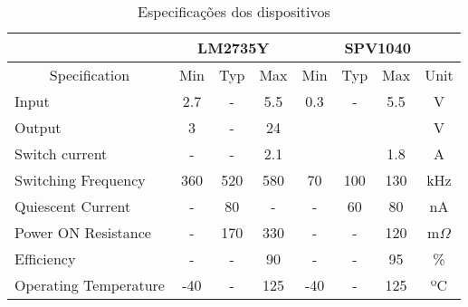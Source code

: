 \begin{table}
\centering
\caption{Especificações dos dispositivos}
\label{comparison_specs_table}
\begin{tabular}{|l|ccc|ccc|c|} 
\cline{2-8}
\multicolumn{1}{c|}{}               & \multicolumn{3}{c|}{LM2735Y}                              & \multicolumn{4}{c|}{SPV1040}                                           \\ 
\hline
\multicolumn{1}{|c|}{Specification} & \multicolumn{1}{c|}{Min} & \multicolumn{1}{c|}{Typ} & Max & \multicolumn{1}{c|}{Min} & \multicolumn{1}{c|}{Typ} & Max & Unit       \\ 
\hline
Input                               & 2.7                      & -                        & 5.5 & 0.3                      & -                        & 5.5 & V          \\ 
\hline
Output                              & 3                        & -                        & 24  &                          &                          &     & V          \\ 
\hline
Switch current                      & -                        & -                        & 2.1 &                          &                          & 1.8 & A          \\ 
\hline
Switching Frequency                 & 360                      & 520                      & 580 & 70                       & 100                      & 130 & kHz        \\ 
\hline
Quiescent Current                   & -                        & 80                       & -   & -                        & 60                       & 80  & nA         \\ 
\hline
Power ON Resistance                 & -                        & 170                      & 330 & -                        & -                        & 120 & m$\Omega$  \\ 
\hline
Efficiency                          & -                        & -                        & 90  & -                        & -                        & 95  & \%         \\ 
\hline
Operating Temperature               & -40                      & -                        & 125 & -40                      & -                        & 125 & ºC         \\
\hline
\end{tabular}
\end{table}